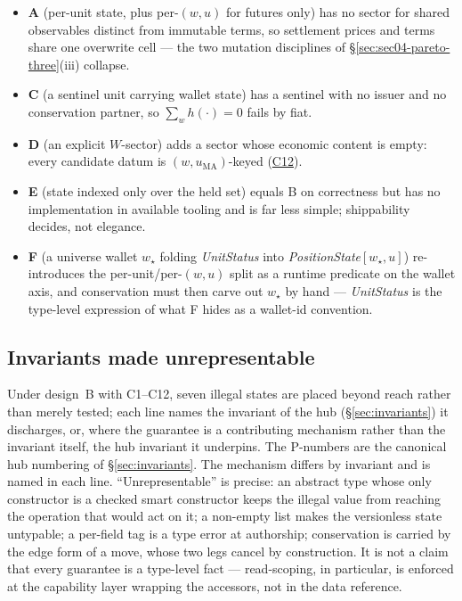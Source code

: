 \begin{itemize}[leftmargin=1.4em]
\item \textbf{A} (per-unit state, plus per-$(w,u)$ for futures only) has no sector for
shared observables distinct from immutable terms, so settlement prices and terms share one
overwrite cell --- the two mutation disciplines of \S\ref{sec:sec04-pareto-three}(iii)
collapse.
\item \textbf{C} (a sentinel unit carrying wallet state) has a sentinel with no issuer and
no conservation partner, so $\sum_{w}h(\cdot)=0$ fails by fiat.
\item \textbf{D} (an explicit $W$-sector) adds a sector whose economic content is empty:
every candidate datum is $(w,u_{\mathrm{MA}})$-keyed (\hyperref[cond:C12]{C12}).
\item \textbf{E} (state indexed only over the held set) equals B on correctness but has no
implementation in available tooling and is far less simple; shippability decides, not
elegance.
\item \textbf{F} (a universe wallet $w_\star$ folding \emph{UnitStatus} into
\emph{PositionState}$[w_\star,u]$) re-introduces the per-unit/per-$(w,u)$ split as a runtime
predicate on the wallet axis, and conservation must then carve out $w_\star$ by hand ---
\emph{UnitStatus} is the type-level expression of what F hides as a wallet-id convention.
\end{itemize}

\subsection{Invariants made unrepresentable}
\label{sec:sec04-unrep}

Under design~B with C1--C12, seven illegal states are placed beyond reach rather than
merely tested; each line names the invariant of the hub (\S\ref{sec:invariants}) it
discharges, or, where the guarantee is a contributing mechanism rather than the invariant
itself, the hub invariant it underpins. The P-numbers are the canonical hub numbering of
\S\ref{sec:invariants}. The mechanism differs by invariant and is named in each line. ``Unrepresentable'' is precise: an abstract
type whose only constructor is a checked smart constructor keeps the illegal value from
reaching the operation that would act on it; a non-empty list makes the versionless state
untypable; a per-field tag is a type error at authorship; conservation is carried by the edge
form of a move, whose two legs cancel by construction. It is not a claim that every guarantee
is a type-level fact --- read-scoping, in particular, is enforced at the capability layer
wrapping the accessors, not in the data reference.

